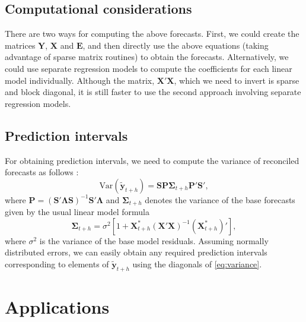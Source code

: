 \documentclass[11pt,a4paper,]{article}
\begin{document}
\hypertarget{computational-considerations}{%
\subsection{\texorpdfstring{Computational considerations \label{sec:computationalconsiderations}}{Computational considerations }}\label{computational-considerations}}

There are two ways for computing the above forecasts. First, we could create the matrices \(\bm{Y}\), \(\bm{X}\) and \(\bm{E}\), and then directly use the above equations (taking advantage of sparse matrix routines) to obtain the forecasts. Alternatively, we could use separate regression models to compute the coefficients for each linear model individually. Although the matrix, \(\bm{X}'\bm{X}\), which we need to invert is sparse and block diagonal, it is still faster to use the second approach involving separate regression models.

\hypertarget{prediction-intervals}{%
\subsection{Prediction intervals}\label{prediction-intervals}}

For obtaining prediction intervals, we need to compute the variance of reconciled forecasts as follows \autocite{mint2018}:
\begin{equation}\label{eq:variance}
    \text{Var}(\tilde{\bm{y}}_{t+h})
        = \bm{S}\bm{P}{\bm{\Sigma}_{t+h}} \bm{P}'\bm{S}',
\end{equation}
where \(\bm{P} = (\bm{S}'\bm{\Lambda}\bm{S})^{-1}\bm{S}'\bm{\Lambda}\) and \({\bm{\Sigma}_{t+h}}\) denotes the variance of the base forecasts given by the usual linear model formula \autocite{fpp2}
\begin{equation}
  \bm{\Sigma}_{t+h} = \sigma^2\left[1 + \bm{X}_{t+h}^*(\bm{X}'\bm{X})^{-1}(\bm{X}_{t+h}^*)'\right],
\end{equation}
where \(\sigma^2\) is the variance of the base model residuals. Assuming normally distributed errors, we can easily obtain any required prediction intervals corresponding to elements of \(\tilde{\bm{y}}_{t+h}\) using the diagonals of \eqref{eq:variance}.

\hypertarget{applications}{%
\section{Applications}\label{applications}}
\end{document}
